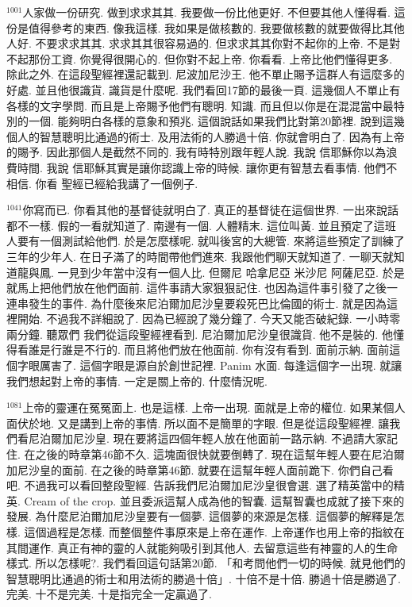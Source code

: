 \documentclass{book}
\begin{document}
$^{1001}$人家做一份研究.
做到求求其其.
我要做一份比他更好.
不但要其他人懂得看.
這份是值得參考的東西.
像我這樣.
我如果是做核數的.
我要做核數的就要做得比其他人好.
不要求求其其.
求求其其很容易過的.
但求求其其你對不起你的上帝.
不是對不起那份工資.
你覺得很開心的.
但你對不起上帝.
你看看.
上帝比他們懂得更多.
除此之外.
在這段聖經裡還記載到.
尼波加尼沙王.
他不單止賜予這群人有這麼多的好處.
並且他很識貨.
識貨是什麼呢.
我們看回17節的最後一頁.
這幾個人不單止有各樣的文字學問.
而且是上帝賜予他們有聰明.
知識.
而且但以你是在混混當中最特別的一個.
能夠明白各樣的意象和預兆.
這個說話如果我們比對第20節裡.
說到這幾個人的智慧聰明比通過的術士.
及用法術的人勝過十倍.
你就會明白了.
因為有上帝的賜予.
因此那個人是截然不同的.
我有時特別跟年輕人說.
我說 信耶穌你以為浪費時間.
我說 信耶穌其實是讓你認識上帝的時候.
讓你更有智慧去看事情.
他們不相信.
你看 聖經已經給我講了一個例子.

$^{1041}$你寫而已.
你看其他的基督徒就明白了.
真正的基督徒在這個世界.
一出來說話都不一樣.
假的一看就知道了.
南邊有一個.
人體精末.
這位叫黃.
並且預定了這班人要有一個測試給他們.
於是怎麼樣呢.
就叫後宮的大總管.
來將這些預定了訓練了三年的少年人.
在日子滿了的時間帶他們進來.
我跟他們聊天就知道了.
一聊天就知道龍與鳳.
一見到少年當中沒有一個人比.
但爾尼 哈拿尼亞 米沙尼 阿薩尼亞.
於是就馬上把他們放在他們面前.
這件事請大家狠狠記住.
也因為這件事引發了之後一連串發生的事件.
為什麼後來尼泊爾加尼沙皇要殺死巴比倫國的術士.
就是因為這裡開始.
不過我不詳細說了.
因為已經說了幾分鐘了.
今天又能否破紀錄.
一小時零兩分鐘.
聽眾們 我們從這段聖經裡看到.
尼泊爾加尼沙皇很識貨.
他不是裝的.
他懂得看誰是行誰是不行的.
而且將他們放在他面前.
你有沒有看到.
面前示納.
面前這個字眼厲害了.
這個字眼是源自於創世記裡.
Panim 水面.
每逢這個字一出現.
就讓我們想起對上帝的事情.
一定是關上帝的.
什麼情況呢.

$^{1081}$上帝的靈運在冤冤面上.
也是這樣.
上帝一出現.
面就是上帝的權位.
如果某個人面伏於地.
又是講到上帝的事情.
所以面不是簡單的字眼.
但是從這段聖經裡.
讓我們看尼泊爾加尼沙皇.
現在要將這四個年輕人放在他面前一路示納.
不過請大家記住.
在之後的時章第46節不久.
這塊面很快就要倒轉了.
現在這幫年輕人要在尼泊爾加尼沙皇的面前.
在之後的時章第46節.
就要在這幫年輕人面前跪下.
你們自己看吧.
不過我可以看回整段聖經.
告訴我們尼泊爾加尼沙皇很會選.
選了精英當中的精英.
Cream of the crop.
並且委派這幫人成為他的智囊.
這幫智囊也成就了接下來的發展.
為什麼尼泊爾加尼沙皇要有一個夢.
這個夢的來源是怎樣.
這個夢的解釋是怎樣.
這個過程是怎樣.
而整個整件事原來是上帝在運作.
上帝運作也用上帝的指紋在其間運作.
真正有神的靈的人就能夠吸引到其他人.
去留意這些有神靈的人的生命樣式.
所以怎樣呢?.
我們看回這句話第20節.
「和考問他們一切的時候.
就見他們的智慧聰明比通過的術士和用法術的勝過十倍」.
十倍不是十倍.
勝過十倍是勝過了.
完美.
十不是完美.
十是指完全一定贏過了.
\end{document}
